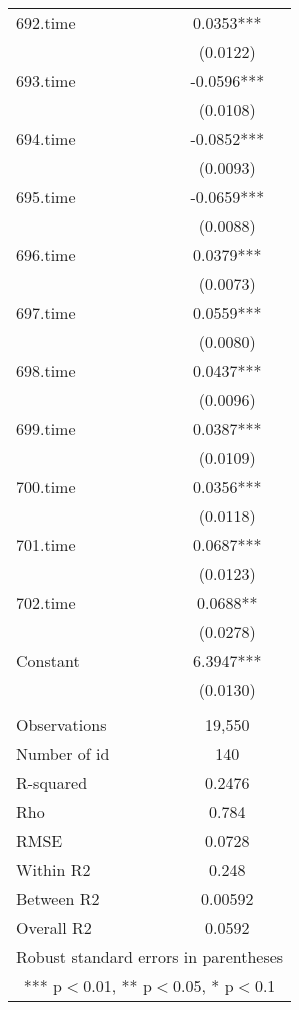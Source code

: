 \documentclass[]{article}
\begin{document}
\begin{tabular}{lc}
692.time & 0.0353*** \\
 & (0.0122) \\
693.time & -0.0596*** \\
 & (0.0108) \\
694.time & -0.0852*** \\
 & (0.0093) \\
695.time & -0.0659*** \\
 & (0.0088) \\
696.time & 0.0379*** \\
 & (0.0073) \\
697.time & 0.0559*** \\
 & (0.0080) \\
698.time & 0.0437*** \\
 & (0.0096) \\
699.time & 0.0387*** \\
 & (0.0109) \\
700.time & 0.0356*** \\
 & (0.0118) \\
701.time & 0.0687*** \\
 & (0.0123) \\
702.time & 0.0688** \\
 & (0.0278) \\
Constant & 6.3947*** \\
 & (0.0130) \\
 &  \\
Observations & 19,550 \\
Number of id & 140 \\
R-squared & 0.2476 \\
Rho & 0.784 \\
RMSE & 0.0728 \\
Within R2 & 0.248 \\
Between R2 & 0.00592 \\
 Overall R2 & 0.0592 \\ \hline
\multicolumn{2}{c}{ Robust standard errors in parentheses} \\
\multicolumn{2}{c}{ *** p$<$0.01, ** p$<$0.05, * p$<$0.1} \\
\end{tabular}
\end{document}
